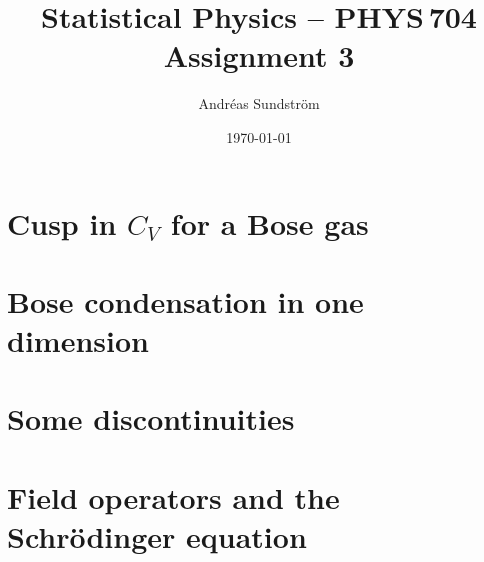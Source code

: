 \documentclass[11pt,letter, swedish, english
]{article}
\begin{document}
\title{Statistical Physics -- PHYS\,704 \\
Assignment 3}
\author{Andréas Sundström}
\date{\today}

\maketitle



\section{Cusp in $C_V$ for a Bose gas}



\section{Bose condensation in one dimension}


\section{Some discontinuities}


\section{Field operators and the Schrödinger equation}
\end{document}
